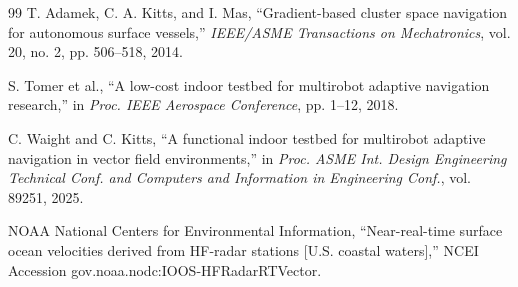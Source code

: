 \documentclass[lettersize,journal]{IEEEtran}
\begin{document}
\begin{thebibliography}{99}
 T. Adamek, C. A. Kitts, and I. Mas, ``Gradient-based cluster space
navigation for autonomous surface vessels,'' \textit{IEEE/ASME Transactions on
Mechatronics}, vol. 20, no. 2, pp. 506--518, 2014.

 S. Tomer et al., ``A low-cost indoor testbed for multirobot
adaptive navigation research,'' in \textit{Proc. IEEE Aerospace Conference},
pp. 1--12, 2018.

 C. Waight and C. Kitts, ``A functional indoor testbed for
multirobot adaptive navigation in vector field environments,'' in
\textit{Proc. ASME Int. Design Engineering Technical Conf. and Computers
and Information in Engineering Conf.}, vol. 89251, 2025.

 NOAA National Centers for Environmental Information,
``Near-real-time surface ocean velocities derived from HF-radar stations
[U.S. coastal waters],'' NCEI Accession
gov.noaa.nodc:IOOS-HFRadarRTVector.

\end{thebibliography}
\end{document}
